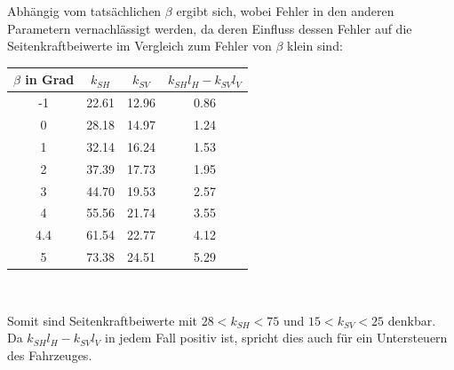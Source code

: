 Abhängig vom tatsächlichen $\beta$ ergibt sich, wobei Fehler in den anderen Parametern vernachlässigt werden, da deren Einfluss dessen Fehler auf die Seitenkraftbeiwerte im Vergleich zum Fehler von $\beta$ klein sind:\\
\begin{center}
\begin{tabular}{|c|c|c|c|}
\hline
$\beta$ in Grad & $k_{SH}$& $k_{SV}$&$k_{SH}l_H-k_{SV}l_V$ \\\hline

-1  & 22.61 & 12.96&0.86\\\hline
0  & 28.18 & 14.97&1.24\\\hline
1  & 32.14 & 16.24&1.53\\\hline
2  & 37.39 & 17.73&1.95\\\hline
3  & 44.70 & 19.53&2.57\\\hline
4  & 55.56 & 21.74&3.55\\\hline
4.4  & 61.54 & 22.77&4.12\\\hline
5  & 73.38 & 24.51&5.29\\\hline

\end{tabular}\\
\end{center}
Somit sind Seitenkraftbeiwerte mit $28<k_{SH}<75$ und $15<k_{SV}<25$ denkbar. Da $k_{SH}l_H-k_{SV}l_V$ in jedem Fall positiv ist, spricht dies auch für ein Untersteuern des Fahrzeuges.
